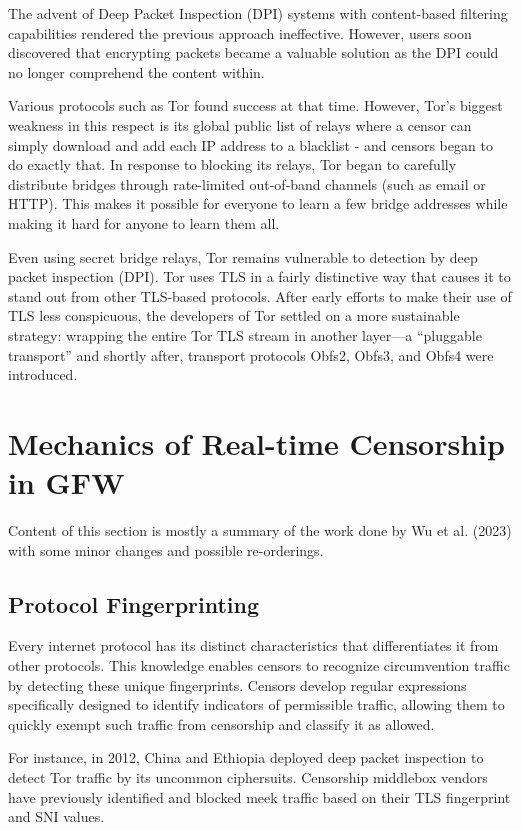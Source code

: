 The advent of Deep Packet Inspection (DPI) systems with content-based filtering capabilities rendered the previous approach ineffective. However, users soon discovered that encrypting packets became a valuable solution as the DPI could no longer comprehend the content within.\cite{leberknight2010taxonomy}

Various protocols such as Tor found success at that time. However, Tor’s biggest weakness in this respect is its global public list of relays where a censor can simply download and add each IP address to a blacklist - and censors began to do exactly that. In response to blocking its relays, Tor began to carefully distribute bridges through rate-limited out-of-band channels (such as email or HTTP). This makes it possible for everyone to learn a few bridge addresses while making it hard for anyone to learn them all.

Even using secret bridge relays, Tor remains vulnerable to detection by deep packet inspection (DPI). Tor uses TLS in a fairly distinctive way that causes it to stand out from other TLS-based protocols. After early efforts to make their use of TLS less conspicuous, the developers of Tor settled on a more sustainable strategy: wrapping the entire Tor TLS stream in another layer—a “pluggable transport” and shortly after, transport protocols Obfs2, Obfs3, and Obfs4 were introduced.\cite{ensafi2015firewall}

\section{Mechanics of Real-time Censorship in GFW}
Content of this section is mostly a summary of the work done by Wu et al. (2023) with some minor changes  and possible re-orderings.\cite{wu2023great}

\subsection{Protocol Fingerprinting}
Every internet protocol has its distinct characteristics that differentiates it from other protocols. This knowledge enables censors to recognize circumvention traffic by detecting these unique fingerprints. Censors develop regular expressions specifically designed to identify indicators of permissible traffic, allowing them to quickly exempt such traffic from censorship and classify it as allowed.

For instance, in 2012, China and Ethiopia deployed deep packet inspection to detect Tor traffic by its uncommon ciphersuits. Censorship middlebox vendors have previously identified and blocked meek traffic based on their TLS fingerprint and SNI values.\cite{wu2023great}

